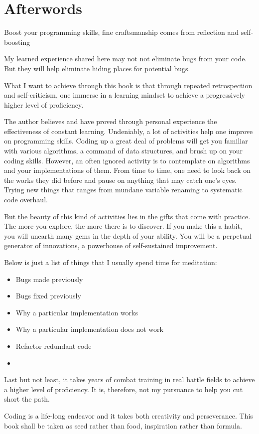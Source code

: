 
\chapter*{Afterwords}
Boost your programming skills, fine craftsmanship comes from reflection and self-boosting

My learned experience shared here may not not eliminate bugs from your code.
But they will help eliminate hiding places for potential bugs.

What I want to achieve through this book is that through repeated retrospection and
self-criticism, one immerse in a learning mindset to achieve a progressively higher
level of proficiency.

The author believes and have proved through personal experience the effectiveness of constant
learning.
Undeniably, a lot of activities help one improve on programming skills.
Coding up a great deal of problems will get you familiar with various algorithms, a command of
data structures, and brush up on your coding skills.
However, an often ignored activity is to contemplate on algorithms and your implementations of them.
From time to time, one need to look back on the works they did before and pause on
anything that may catch one's eyes.
Trying new things that ranges from mundane variable renaming to systematic code overhaul.

But the beauty of this kind of activities lies in the gifts that come with practice.
The more you explore, the more there is to discover.
If you make this a habit, you will unearth many gems in the depth of your ability.
You will be a perpetual generator of innovations, a powerhouse of self-sustained improvement.

Below is just a list of things that I usually spend time for meditation:
\begin{itemize}
    \item Bugs made previously
    \item Bugs fixed previously
    \item Why a particular implementation works
    \item Why a particular implementation does not work
    \item Refactor redundant code
    \item
\end{itemize}

Last but not least, it takes years of combat training in real battle fields to achieve a higher
level of proficiency.
It is, therefore, not my pursuance to help you cut short the path.


Coding is a life-long endeavor and it takes both creativity and perseverance.
This book shall be taken as seed rather than food, inspiration rather than formula.
